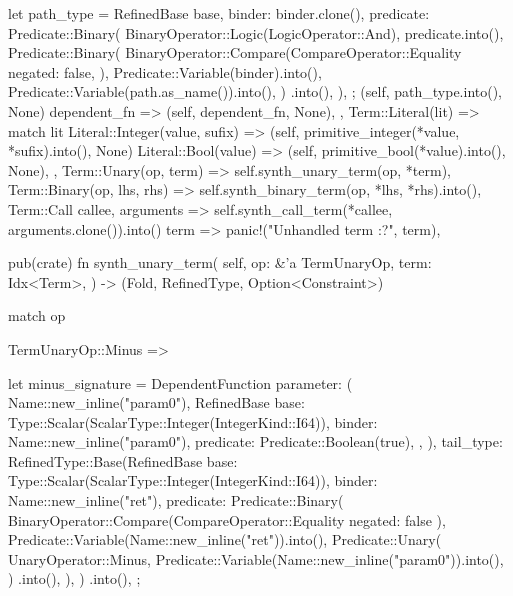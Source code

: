 \documentclass[
  oneside,
  english,
  coorientadorbanca,
  noabntexcite
]{ufsc-thesis-rn46-2019}
\begin{document}
\begin{rustcode}
{{{{{                    let path_type = RefinedBase {
                        base,
                        binder: binder.clone(),
                        predicate: Predicate::Binary(
                            BinaryOperator::Logic(LogicOperator::And),
                            predicate.into(),
                            Predicate::Binary(
                                BinaryOperator::Compare(CompareOperator::Equality {
                                    negated: false,
                                }),
                                Predicate::Variable(binder).into(),
                                Predicate::Variable(path.as_name()).into(),
                            )
                            .into(),
                        ),
                    };
                    (self, path_type.into(), None)
                }
                dependent_fn => (self, dependent_fn, None),
            },
            Term::Literal(lit) => match lit {
                Literal::Integer(value, sufix) => {
                    (self, primitive_integer(*value, *sufix).into(), None)
                }
                Literal::Bool(value) => (self, primitive_bool(*value).into(), None),
            },
            Term::Unary(op, term) => self.synth_unary_term(op, *term),
            Term::Binary(op, lhs, rhs) => self.synth_binary_term(op, *lhs, *rhs).into(),
            Term::Call { callee, arguments } => {
                self.synth_call_term(*callee, arguments.clone()).into()
            }
            term => panic!("Unhandled term {:?}", term),
        }
    }

    pub(crate) fn synth_unary_term(
        self,
        op: &'a TermUnaryOp,
        term: Idx<Term>,
    ) -> (Fold, RefinedType, Option<Constraint>) {
        match op {
            TermUnaryOp::Minus => {
                let minus_signature = DependentFunction {
                    parameter: (
                        Name::new_inline("param0"),
                        RefinedBase {
                            base: Type::Scalar(ScalarType::Integer(IntegerKind::I64)),
                            binder: Name::new_inline("param0"),
                            predicate: Predicate::Boolean(true),
                        },
                    ),
                    tail_type: RefinedType::Base(RefinedBase {
                        base: Type::Scalar(ScalarType::Integer(IntegerKind::I64)),
                        binder: Name::new_inline("ret"),
                        predicate: Predicate::Binary(
                            BinaryOperator::Compare(CompareOperator::Equality { negated: false }),
                            Predicate::Variable(Name::new_inline("ret")).into(),
                            Predicate::Unary(
                                UnaryOperator::Minus,
                                Predicate::Variable(Name::new_inline("param0")).into(),
                            )
                            .into(),
                        ),
                    })
                    .into(),
                };

}}}}
\end{rustcode}
\end{document}
